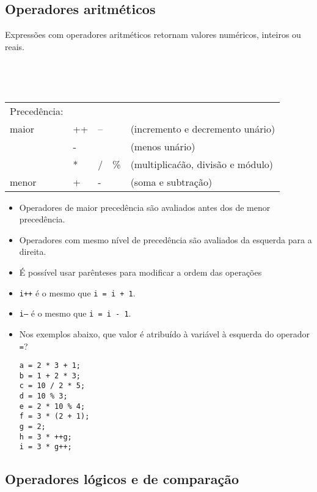 \subsection{Operadores aritméticos}

Expressões com operadores aritméticos retornam valores numéricos, inteiros ou reais.

~\\

{\tt
\begin{tabular}{|l|llll|}
\hline
Precedência:        &    &    &     &                                    \\
maior               & ++ & -- &     & (incremento e decremento unário)   \\
                    & -  &    &     & (menos unário)                     \\
                    & *  & /  & \%  & (multiplicaćão, divisão e módulo)  \\
menor               & +  & -  &     & (soma e subtração)                 \\
\hline
\end{tabular}
}

\begin{itemize}

\item Operadores de maior precedência são avaliados antes dos de menor precedência.
\item Operadores com mesmo nível de precedência são avaliados da esquerda para a direita.
\item É possível usar parênteses para modificar a ordem das operações
\item {\tt i++} é o mesmo que {\tt i = i + 1}.
\item {\tt i--} é o mesmo que {\tt i = i - 1}.

\item Nos exemplos abaixo, que valor é atribuído à variável à esquerda do operador {\tt =}?

\begin{lstlisting}
a = 2 * 3 + 1;
b = 1 + 2 * 3;
c = 10 / 2 * 5;
d = 10 % 3;
e = 2 * 10 % 4;
f = 3 * (2 + 1);
g = 2;
h = 3 * ++g;
i = 3 * g++;
\end{lstlisting}

\end{itemize}

\subsection{Operadores lógicos e de comparação}

